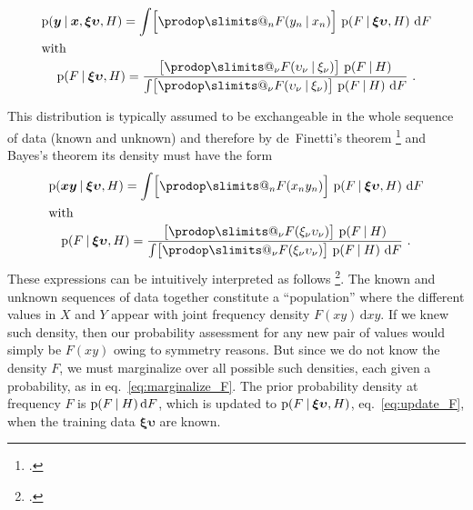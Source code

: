 \documentclass[\ifafour a4paper,12pt,\else a5paper,10pt,\fi%
onecolumn,oneside,article,%
british%
]{memoir}
\makeatletter
\theoremstyle{remark}
\theoremstyle{innote}
\def\prod{\DOTSI\prodop\slimits@}
\newcommand*{\citep}{\footcites}
\newcommand*{\di}{\mathrm{d}}%
\newcommand*{\p}{\mathrm{p}}%
\renewcommand*{\|}[1][]{\nonscript\:#1\vert\nonscript\:\mathopen{}}
\newcommand*{\chap}{ch.}%
\newcommand*{\eqn}{eq.}%
\newcommand*{\cf}{{cf.}}
\newcommand*{\xx}[1]{x_{#1}}
\newcommand*{\yy}[1]{y_{#1}}
\newcommand*{\bx}{\bm{x}}
\newcommand*{\by}{\bm{y}}
\newcommand*{\bz}{\bm{xy}}
\newcommand*{\xxx}[1]{\xi_{#1}}
\newcommand*{\yyy}[1]{\upsilon_{#1}}
\newcommand*{\bzz}{\bm{\xi\upsilon}}
\makeatother
\begin{document}
\begin{subequations} \label{eq:exchangeable_conditional}
  \begin{gather}
    \label{eq:marginalize_conditional}
    \p(\by \| \bx, \bzz, H) =
    \int \Bigl[\prod_{n} F(\yy{n}\|\xx{n})\Bigr] \ \p(F \| \bzz, H)\ \di F
    \\\shortintertext{with}
    \label{eq:update_conditional}
    \p(F \| \bzz, H) =
    \frac{
      \bigl[\prod_{\nu} F(\yyy{\nu}\|\xxx{\nu}) \bigr]\ \p(F \| H)
    }{
      \int \bigl[\prod_{\nu} F(\yyy{\nu}\|\xxx{\nu}) \bigr]\ \p(F \| H)\ \di F
    } \ .
  \end{gather}
\end{subequations}








This distribution is typically assumed to be exchangeable in the whole
sequence of data (known and unknown) and therefore by de~Finetti's theorem
\citep{definetti1930,definetti1937,hewittetal1955}[\chap~4]{bernardoetal1994_r2000}[for
an insightful summary see]{dawid2013} and Bayes's theorem its density must
have the form
\begin{subequations} \label{eq:exchangeable_prob}
  \begin{gather}
    \label{eq:marginalize_F}
    \p(\bz \| \bzz, H) =
    \int \Bigl[\prod_{n} F(\xx{n}\yy{n})\Bigr] \ \p(F \| \bzz, H)\ \di F
    \\\shortintertext{with}
    \label{eq:update_F}
    \p(F \| \bzz, H) =
    \frac{
      \bigl[\prod_{\nu} F(\xxx{\nu}\yyy{\nu}) \bigr]\ \p(F \| H)
    }{
      \int \bigl[\prod_{\nu} F(\xxx{\nu}\yyy{\nu}) \bigr]\ \p(F \| H)\ \di F
    } \ .
  \end{gather}
\end{subequations}
These expressions can be intuitively interpreted as follows
\citep[\cf][]{lindleyetal1981}. The known and unknown sequences of data
together constitute a \enquote{population} where the different values in
$X$ and $Y$ appear with joint frequency density $F(xy)\,\di xy$. If we knew
such density, then our probability assessment for any new pair of values
would simply be $F(xy)$ owing to symmetry reasons. But since we do not know
the density $F$, we must marginalize over all possible such densities, each
given a probability, as in \eqn~\eqref{eq:marginalize_F}. The prior
probability density at frequency $F$ is $\p(F \| H)\,\di F$, which is
updated to $\p(F \| \bzz, H)$, \eqn~\eqref{eq:update_F}, when the training
data $\bzz$ are known.
\end{document}
